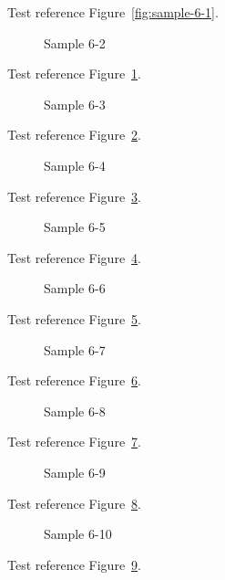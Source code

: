 Test reference Figure~\ref{fig:sample-6-1}.

\begin{figure}[tbhp]
\caption{Sample 6-2}
\label{fig:sample-6-2}
\end{figure}

Test reference Figure~\ref{fig:sample-6-2}.

\begin{figure}[tbhp]
\caption{Sample 6-3}
\label{fig:sample-6-3}
\end{figure}

Test reference Figure~\ref{fig:sample-6-3}.

\begin{figure}[tbhp]
\caption{Sample 6-4}
\label{fig:sample-6-4}
\end{figure}

Test reference Figure~\ref{fig:sample-6-4}.

\begin{figure}[tbhp]
\caption{Sample 6-5}
\label{fig:sample-6-5}
\end{figure}

Test reference Figure~\ref{fig:sample-6-5}.

\begin{figure}[tbhp]
\caption{Sample 6-6}
\label{fig:sample-6-6}
\end{figure}

Test reference Figure~\ref{fig:sample-6-6}.

\begin{figure}[tbhp]
\caption{Sample 6-7}
\label{fig:sample-6-7}
\end{figure}

Test reference Figure~\ref{fig:sample-6-7}.

\begin{figure}[tbhp]
\caption{Sample 6-8}
\label{fig:sample-6-8}
\end{figure}

Test reference Figure~\ref{fig:sample-6-8}.

\begin{figure}[tbhp]
\caption{Sample 6-9}
\label{fig:sample-6-9}
\end{figure}

Test reference Figure~\ref{fig:sample-6-9}.

\begin{figure}[tbhp]
\caption{Sample 6-10}
\label{fig:sample-6-10}
\end{figure}

Test reference Figure~\ref{fig:sample-6-10}.


